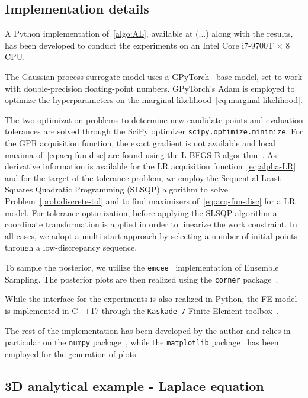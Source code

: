 \subsection{Implementation details}\label{sec:implementation}
A Python implementation of~\ref{algo:AL}, available at (...) along with the results, has been developed to conduct the experiments on an Intel Core i7-9700T × 8 CPU. \medskip

The Gaussian process surrogate model uses a GPyTorch~\cite{GPyTorchPaper} base model, set to work with double-precision floating-point numbers.
GPyTorch's Adam is employed to optimize the hyperparameters on the marginal likelihood~\eqref{eq:marginal-likelihood}. \medskip

The two optimization problems to determine new candidate points and evaluation tolerances are solved through the SciPy optimizer \texttt{scipy.optimize.minimize}. 
For the GPR acquisition function, the exact gradient is not available and local maxima of~\eqref{eq:acq-fun-disc} are found using the L-BFGS-B algorithm~\cite{ZhuBirdNocedal}. 
As derivative information is available for the LR acquisition function~\eqref{eq:alpha-LR} and for the target of the tolerance problem, we employ the Sequential Least Squares Quadratic Programming (SLSQP) algorithm to solve Problem~\eqref{prob:discrete-tol} and to find maximizers of~\eqref{eq:acq-fun-disc} for a LR model. 
For tolerance optimization, before applying the SLSQP algorithm a coordinate transformation is applied in order to linearize the work constraint. 
In all cases, we adopt a multi-start approach by selecting a number of initial points through a low-discrepancy sequence. \medskip

To sample the posterior, we utilize the \texttt{emcee}~\cite{emceePaper} implementation of Ensemble Sampling. The posterior plots are then realized using the \texttt{corner} package~\cite{corner}. \medskip

While the interface for the experiments is also realized in Python, the FE model is implemented in C++17 through the \texttt{Kaskade 7} Finite Element toolbox~\cite{GoetschelSchielaWeiser2021}.\medskip

The rest of the implementation has been developed by the author and relies in particular on the \texttt{numpy} package~\cite{numpy}, while the \texttt{matplotlib} package~\cite{matplotlib} has been employed for the generation of plots. 

\subsection{3D analytical example - Laplace equation}\label{sec:3dexp}

